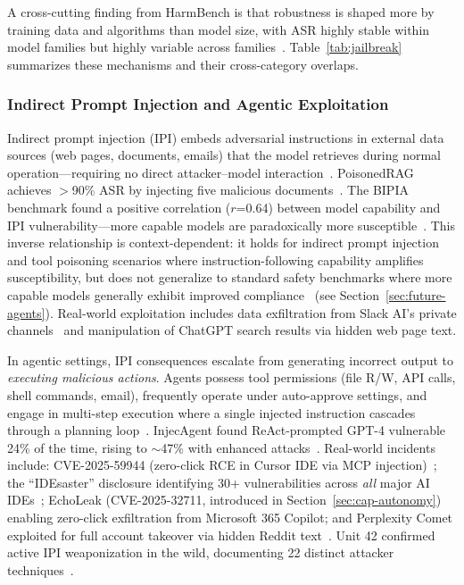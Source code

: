 A cross-cutting finding from HarmBench is that robustness is shaped more by training data and algorithms than model size, with ASR highly stable within model families but highly variable across families~\cite{mazeika2024harmbench}. Table~\ref{tab:jailbreak} summarizes these mechanisms and their cross-category overlaps.




\subsubsection{Indirect Prompt Injection and Agentic Exploitation}
\label{sec:threat-ipi}

Indirect prompt injection (IPI) embeds adversarial instructions in external data sources (web pages, documents, emails) that the model retrieves during normal operation---requiring no direct attacker--model interaction~\cite{greshake2023ipi}. PoisonedRAG achieves $>$90\% ASR by injecting five malicious documents~\cite{zou2025poisonedrag}. The BIPIA benchmark found a positive correlation ($r$=0.64) between model capability and IPI vulnerability---more capable models are paradoxically more susceptible~\cite{yi2025bipia}. This inverse relationship is context-dependent: it holds for indirect prompt injection and tool poisoning scenarios where instruction-following capability amplifies susceptibility, but does not generalize to standard safety benchmarks where more capable models generally exhibit improved compliance~\cite{rottger2024xstest} (see Section~\ref{sec:future-agents}). Real-world exploitation includes data exfiltration from Slack AI's private channels~\cite{promptarmor2024slack} and manipulation of ChatGPT search results via hidden web page text.

In agentic settings, IPI consequences escalate from generating incorrect output to \emph{executing malicious actions}. Agents possess tool permissions (file R/W, API calls, shell commands, email), frequently operate under auto-approve settings, and engage in multi-step execution where a single injected instruction cascades through a planning loop~\cite{schneider2025promptware}. InjecAgent found ReAct-prompted GPT-4 vulnerable 24\% of the time, rising to $\sim$47\% with enhanced attacks~\cite{zhan2024injecagent}. Real-world incidents include: CVE-2025-59944 (zero-click RCE in Cursor IDE via MCP injection)~\cite{lakera2025cursor}; the ``IDEsaster'' disclosure identifying 30+ vulnerabilities across \emph{all} major AI IDEs~\cite{idesaster2025}; EchoLeak (CVE-2025-32711, introduced in Section~\ref{sec:cap-autonomy}) enabling zero-click exfiltration from Microsoft 365 Copilot; and Perplexity Comet exploited for full account takeover via hidden Reddit text~\cite{brave2025comet}. Unit 42 confirmed active IPI weaponization in the wild, documenting 22 distinct attacker techniques~\cite{unit42ipi2026}.

